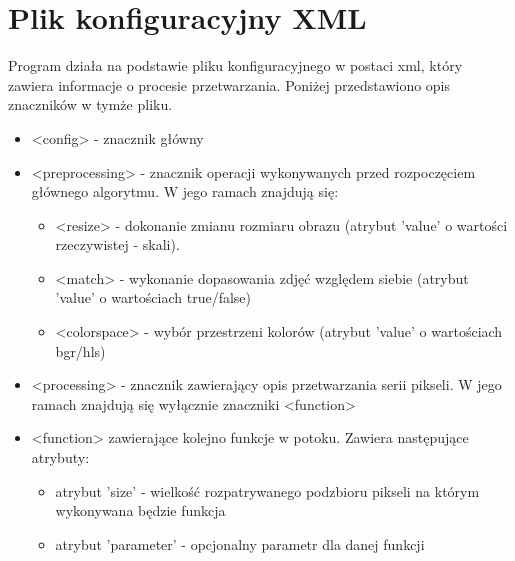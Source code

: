 \section{Plik konfiguracyjny XML}
Program działa na podstawie pliku konfiguracyjnego w postaci xml, który zawiera informacje o procesie przetwarzania. Poniżej przedstawiono opis znaczników w  tymże pliku.
\begin{itemize}
\item <config> - znacznik główny
\item <preprocessing> - znacznik operacji wykonywanych przed rozpoczęciem głównego algorytmu. W jego ramach znajdują się:
\begin{itemize}
\item <resize> - dokonanie zmianu rozmiaru obrazu (atrybut 'value' o wartości rzeczywistej - skali).
\item <match> - wykonanie dopasowania zdjęć względem siebie (atrybut 'value' o wartościach true/false)
\item <colorspace> - wybór przestrzeni kolorów (atrybut 'value' o wartościach bgr/hls)
\end{itemize}
\item <processing> - znacznik zawierający opis przetwarzania serii pikseli. W jego ramach znajdują się wyłącznie znaczniki <function>
\item <function> zawierające kolejno funkcje w potoku. Zawiera następujące atrybuty:
\begin{itemize}
\item atrybut 'size' - wielkość rozpatrywanego podzbioru pikseli na którym wykonywana będzie funkcja
\item atrybut 'parameter' - opcjonalny parametr dla danej funkcji
\end{itemize}
\end{itemize}